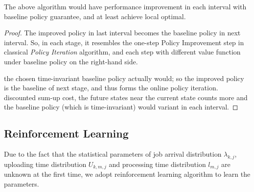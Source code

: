 \begin{lemma}
    The above algorithm would have performance improvement in each interval with baseline policy guarantee, and at least achieve local optimal.
\end{lemma}
\begin{proof}
    The improved policy in last interval becomes the baseline policy in next interval.
    So, in each stage, it resembles the one-step Policy Improvement step in classical \emph{Policy Iteration} algorithm, and each step with different value function under baseline policy on the right-hand side.
    
     the chosen time-invariant baseline policy actually would; so the improved policy is the baseline of next stage, and thus forms the online policy iteration.
    discounted sum-up cost, the future states near the current state counts more and the baseline policy (which is time-invariant) would variant in each interval.
\end{proof}

\subsection{Reinforcement Learning}
Due to the fact that the statistical parameters of job arrival distribution $\lambda_{k,j}$, uploading time distribution $U_{k,m,j}$ and processing time distribution $l_{m,j}$ are unknown at the first time, we adopt reinforcement learning algorithm to learn the parameters.
